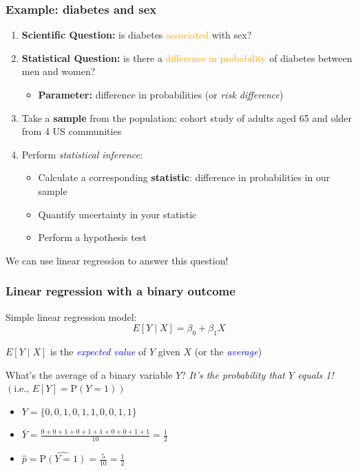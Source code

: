 \documentclass[12pt, 
hyperref={colorlinks=true, linkcolor=blue, urlcolor=cyan}]{beamer}
\begin{document}
\begin{frame}
\frametitle{Example: diabetes and sex}

\begin{enumerate}
\item \textbf{Scientific Question:} is diabetes \textcolor{orange}{associated} with sex? \pause
\item \textbf{Statistical Question:} is there a \textcolor{orange}{difference in probability} of diabetes between men and women? \pause
	\begin{itemize}
	\item \textbf{Parameter:} difference in probabilities (or \textit{risk difference}) \pause
	\end{itemize}
\item Take a \textbf{sample} from the population: cohort study of adults aged 65 and older from 4 US communities \pause
\item Perform \textit{statistical inference}:
	\begin{itemize}
	\item Calculate a corresponding \textbf{statistic}: difference in probabilities in our sample
	\item Quantify uncertainty in your statistic
	\item Perform a hypothesis test \pause
	\end{itemize}
\end{enumerate}

We can use linear regression to answer this question!
\end{frame}

\begin{frame}
\frametitle{Linear regression with a binary outcome}

Simple linear regression model: $$E[Y \mid X] = \beta_0 + \beta_1 X$$

$E[Y \mid X]$ is the \textcolor{blue}{\textit{expected value}} of $Y$ given $X$ (or the \textcolor{blue}{\textit{average}}) \pause

What's the average of a binary variable $Y$? \pause \textit{It's the probability that $Y$ equals 1!} $\left(\text{i.e., } E[Y] = \text{P}(Y=1)\right)$ \pause

\begin{itemize} \itemsep +12pt
\item[] $Y = \{ 0, 0, 1, 0, 1, 1, 0, 0, 1, 1 \}$ \pause
\item[] $\bar{Y} = \frac{0 + 0 + 1 + 0 + 1 + 1 + 0 + 0 + 1 + 1}{10} = \frac{1}{2}$ \pause
\item[] $\hat{p} = \widehat{\text{P}(Y=1)} = \frac{5}{10} = \frac{1}{2} $
\end{itemize}
\end{frame}
\end{document}
